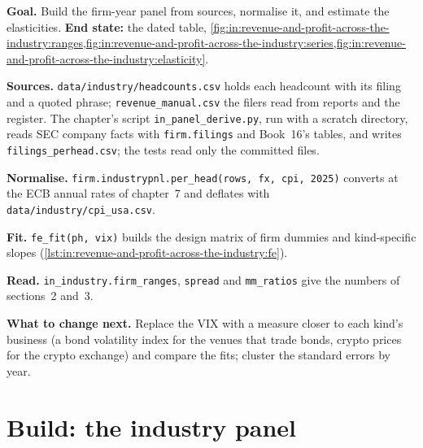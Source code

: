 \begin{tutorial}
\textbf{Goal.} Build the firm-year panel from sources, normalise it, and estimate the elasticities.
\textbf{End state:} the dated table,
\cref{fig:in:revenue-and-profit-across-the-industry:ranges,fig:in:revenue-and-profit-across-the-industry:series,fig:in:revenue-and-profit-across-the-industry:elasticity}.
\begin{tutsteps}
\item \textbf{Sources.} \texttt{data/industry/headcounts.csv} holds each headcount with its filing and a quoted phrase;
\texttt{revenue\_manual.csv} the filers read from reports and the register. The chapter's script
\texttt{in\_panel\_derive.py}, run with a scratch directory, reads SEC company facts with \texttt{firm.filings} and
Book~16's tables, and writes \texttt{filings\_perhead.csv}; the tests read only the committed files.
\item \textbf{Normalise.} \texttt{firm.industrypnl.per\_head(rows, fx, cpi, 2025)} converts at the ECB annual rates of
chapter~7 and deflates with \texttt{data/industry/cpi\_usa.csv}.
\item \textbf{Fit.} \texttt{fe\_fit(ph, vix)} builds the design matrix of firm dummies and kind-specific slopes
(\cref{lst:in:revenue-and-profit-across-the-industry:fe}).
\label{lst:in:revenue-and-profit-across-the-industry:fe}
\item \textbf{Read.} \texttt{in\_industry.firm\_ranges}, \texttt{spread} and \texttt{mm\_ratios} give the numbers of
sections~2 and~3.
\end{tutsteps}
\end{tutorial}

\textbf{What to change next.} Replace the VIX with a measure closer to each kind's business (a bond volatility index
for the venues that trade bonds, crypto prices for the crypto exchange) and compare the fits; cluster the standard
errors by year.

\section{Build: the industry panel}\label{bld:in:revenue-and-profit-across-the-industry:industrypnl}

